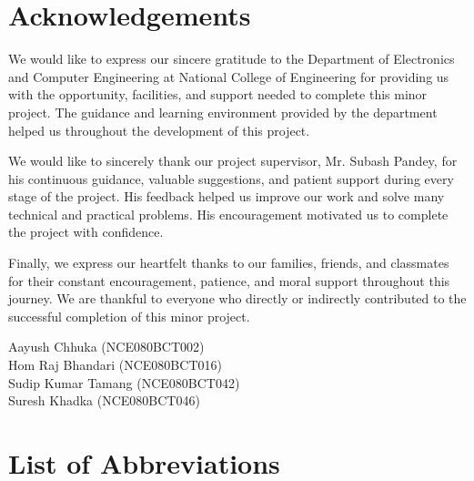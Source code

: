 \documentclass[12pt, a4paper]{report}
\numberwithin{figure}{chapter}
\numberwithin{table}{chapter}
\numberwithin{equation}{chapter}
\begin{document}


\setcounter{page}{1}

\chapter*{Acknowledgements}

We would like to express our sincere gratitude to the Department of Electronics and Computer Engineering at National College of Engineering for providing us with the opportunity, facilities, and support needed to complete this minor project. The guidance and learning environment provided by the department helped us throughout the development of this project.

We would like to sincerely thank our project supervisor, Mr. Subash Pandey, for his continuous guidance, valuable suggestions, and patient support during every stage of the project. His feedback helped us improve our work and solve many technical and practical problems. His encouragement motivated us to complete the project with confidence.

Finally, we express our heartfelt thanks to our families, friends, and classmates for their constant encouragement, patience, and moral support throughout this journey. We are thankful to everyone who directly or indirectly contributed to the successful completion of this minor project.

\vspace{2cm}
\noindent
Aayush Chhuka (NCE080BCT002) \\
Hom Raj Bhandari (NCE080BCT016) \\
Sudip Kumar Tamang (NCE080BCT042) \\
Suresh Khadka (NCE080BCT046)

\newpage

\tableofcontents
\newpage

\listoffigures
{}
\newpage

\listoftables
{}
\newpage

\chapter*{List of Abbreviations}
\end{document}
